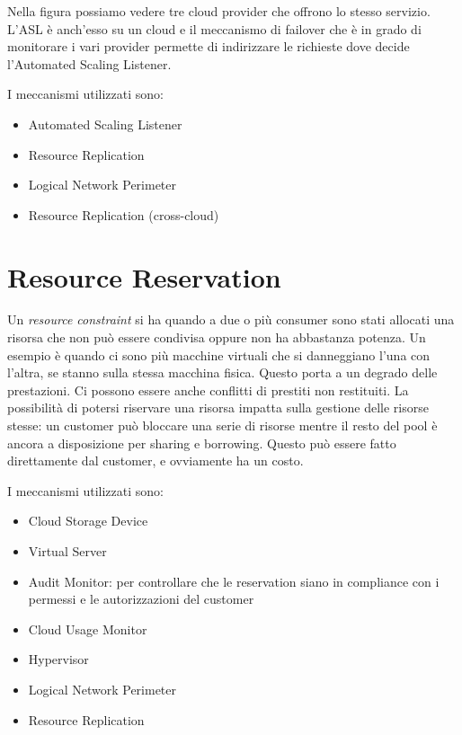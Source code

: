 Nella figura possiamo vedere tre cloud provider che offrono lo stesso servizio. L'ASL è anch'esso su un cloud e il meccanismo di failover che è in grado di monitorare i vari provider permette di indirizzare le richieste dove decide l'Automated Scaling Listener. 

I meccanismi utilizzati sono:
\begin{itemize}
    \item Automated Scaling Listener
    \item Resource Replication
    \item Logical Network Perimeter
    \item Resource Replication (cross-cloud)
\end{itemize}

\section{Resource Reservation}
Un \textit{resource constraint} si ha quando a due o più consumer sono stati allocati una risorsa che non può essere condivisa oppure non ha abbastanza potenza. Un esempio è quando ci sono più macchine virtuali che si danneggiano l'una con l'altra, se stanno sulla stessa macchina fisica. Questo porta a un degrado delle prestazioni. Ci possono essere anche conflitti di prestiti non restituiti. La possibilità di potersi riservare una risorsa impatta sulla gestione delle risorse stesse: un customer può bloccare una serie di risorse mentre il resto del pool è ancora a disposizione per sharing e borrowing. Questo può essere fatto direttamente dal customer, e ovviamente ha un costo.

I meccanismi utilizzati sono:
\begin{itemize}
    \item Cloud Storage Device
    \item Virtual Server
    \item Audit Monitor: per controllare che le reservation siano in compliance con i permessi e le autorizzazioni del customer
    \item Cloud Usage Monitor
    \item Hypervisor
    \item Logical Network Perimeter
    \item Resource Replication
\end{itemize}

